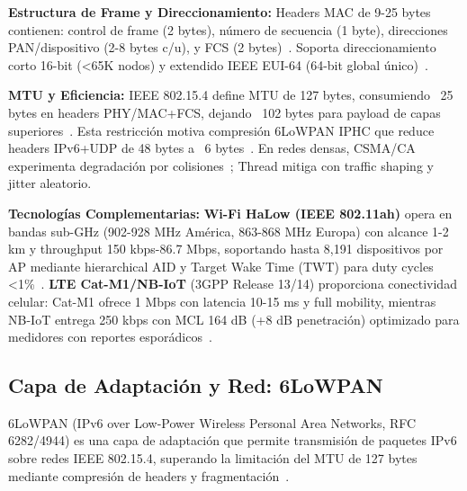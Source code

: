 \textbf{Estructura de Frame y Direccionamiento:} Headers MAC de 9-25 bytes contienen: control de frame (2 bytes), número de secuencia (1 byte), direcciones PAN/dispositivo (2-8 bytes c/u), y FCS (2 bytes)~\cite{shelby6LoWPANWirelessEmbedded2009}. Soporta direccionamiento corto 16-bit (<65K nodos) y extendido IEEE EUI-64 (64-bit global único)~\cite{abdulsalamOverviewRecentWireless2024}.

\textbf{MTU y Eficiencia:} IEEE 802.15.4 define MTU de 127 bytes, consumiendo ~25 bytes en headers PHY/MAC+FCS, dejando ~102 bytes para payload de capas superiores~\cite{shelby6LoWPANWirelessEmbedded2009}. Esta restricción motiva compresión 6LoWPAN IPHC que reduce headers IPv6+UDP de 48 bytes a ~6 bytes~\cite{abood6LoWPANTechnicalFeatures2024,shelby6LoWPANWirelessEmbedded2009}. En redes densas, CSMA/CA experimenta degradación por colisiones~\cite{shelby6LoWPANWirelessEmbedded2009}; Thread mitiga con traffic shaping y jitter aleatorio.

\textbf{Tecnologías Complementarias:} \textbf{Wi-Fi HaLow (IEEE 802.11ah)} opera en bandas sub-GHz (902-928 MHz América, 863-868 MHz Europa) con alcance 1-2 km y throughput 150 kbps-86.7 Mbps, soportando hasta 8,191 dispositivos por AP mediante hierarchical AID y Target Wake Time (TWT) para duty cycles <1\%~\cite{scharerPushingWiFiHaLow2025}. \textbf{LTE Cat-M1/NB-IoT} (3GPP Release 13/14) proporciona conectividad celular: Cat-M1 ofrece 1 Mbps con latencia 10-15 ms y full mobility, mientras NB-IoT entrega 250 kbps con MCL 164 dB (+8 dB penetración) optimizado para medidores con reportes esporádicos~\cite{routrayNarrowbandIoTPrinciples2024}.

\subsection{Capa de Adaptación y Red: 6LoWPAN}

6LoWPAN (IPv6 over Low-Power Wireless Personal Area Networks, RFC 6282/4944) es una capa de adaptación que permite transmisión de paquetes IPv6 sobre redes IEEE 802.15.4, superando la limitación del MTU de 127 bytes mediante compresión de headers y fragmentación~\cite{shelby6LoWPANWirelessEmbedded2009,thungonSurvey6LoWPANSecurity2024,abood6LoWPANTechnicalFeatures2024}.

